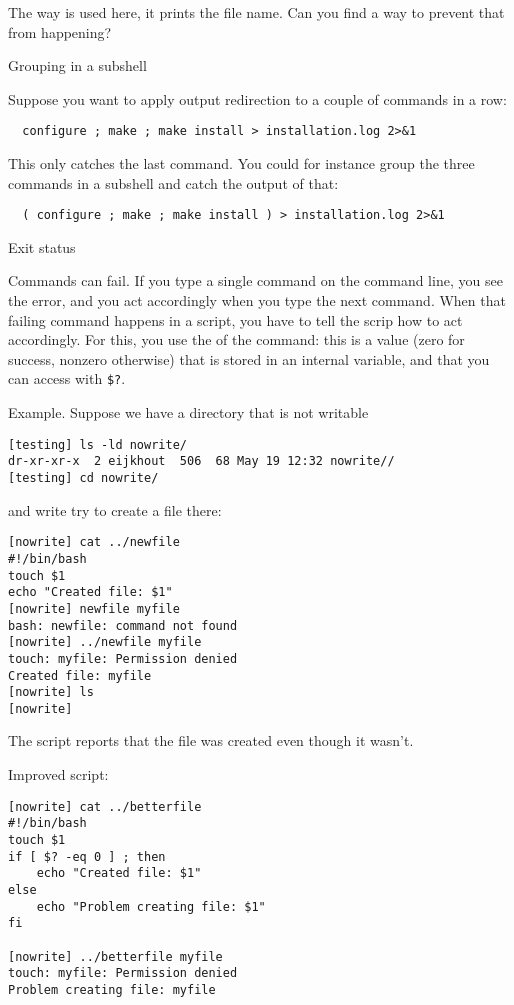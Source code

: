 \begin{exercise}
  The way  is used here, it prints the
  file name. Can you find a way to prevent that from happening?
\end{exercise}

 {Grouping in a subshell}

Suppose you want to apply output redirection to a couple of commands
in a row:
\begin{verbatim}
  configure ; make ; make install > installation.log 2>&1
\end{verbatim}
This only catches the last command. You could for instance group the
three commands in a subshell and catch the output of that:
\begin{verbatim}
  ( configure ; make ; make install ) > installation.log 2>&1
\end{verbatim}

 {Exit status}

Commands can fail. If you type a single command on the command line,
you see the error, and you act accordingly when you type the next
command. When that failing command happens in a script, you have to
tell the scrip how to act accordingly. For this, you use the
 of the command: this is a value (zero for
success, nonzero otherwise) that is stored in an internal variable,
and that you can access with \verb+$?+.

Example. Suppose we have a directory that is not writable
\begin{verbatim}
[testing] ls -ld nowrite/
dr-xr-xr-x  2 eijkhout  506  68 May 19 12:32 nowrite//
[testing] cd nowrite/
\end{verbatim}
and write try to create a file there:
\begin{verbatim}
[nowrite] cat ../newfile 
#!/bin/bash
touch $1
echo "Created file: $1"
[nowrite] newfile myfile
bash: newfile: command not found
[nowrite] ../newfile myfile
touch: myfile: Permission denied
Created file: myfile
[nowrite] ls
[nowrite]
\end{verbatim}
The script reports that the file was created even though it wasn't.

Improved script:
\begin{verbatim}
[nowrite] cat ../betterfile
#!/bin/bash
touch $1
if [ $? -eq 0 ] ; then
    echo "Created file: $1"
else
    echo "Problem creating file: $1"
fi

[nowrite] ../betterfile myfile
touch: myfile: Permission denied
Problem creating file: myfile
\end{verbatim}


